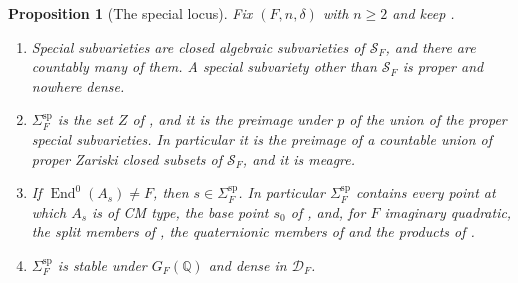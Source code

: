 \documentclass[11pt,reqno]{amsart}
\theoremstyle{plain}
\newtheorem{proposition}[theorem]{Proposition}
\theoremstyle{definition}
\theoremstyle{remark}
\newcommand{\QQ}{\mathbb{Q}}
\newcommand{\cD}{\mathcal{D}}
\newcommand{\cS}{\mathcal{S}}
\DeclareMathOperator{\End}{End}
\begin{document}
\begin{proposition}[The special locus]\label{prop:speciallocus}
Fix $(F,n,\delta)$ with $n\ge2$ and keep .
\begin{enumerate}[label=\textup{(\roman*)},leftmargin=2.6em,itemsep=2pt]
\item Special subvarieties are closed algebraic subvarieties of $\cS_{F}$, and
  there are countably many of them. A special subvariety other than
  $\cS_{F}$ is proper and nowhere dense.
\item $\Sigma^{\mathrm{sp}}_{F}$ is the set $Z$ of , and
  it is the preimage under $p$ of the union of the proper special
  subvarieties. In particular it is the preimage of a countable union of
  proper Zariski closed subsets of $\cS_{F}$, and it is meagre.
\item If $\End^{0}(A_{s})\ne F$, then $s\in\Sigma^{\mathrm{sp}}_{F}$. In
  particular $\Sigma^{\mathrm{sp}}_{F}$ contains every point at which $A_{s}$
  is of CM type, the base point $s_{0}$ of , and, for
  $F$ imaginary quadratic, the split members of , the
  quaternionic members of  and the products of
  .
\item $\Sigma^{\mathrm{sp}}_{F}$ is stable under $G_{F}(\QQ)$ and dense in
  $\cD_{F}$.
\end{enumerate}
\end{proposition}
\end{document}
